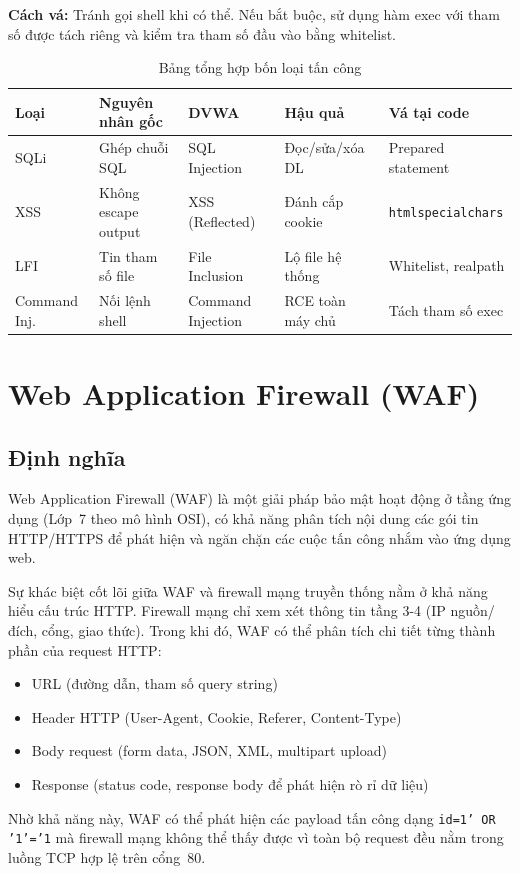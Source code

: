 \documentclass[12pt,a4paper,twoside]{report}
\begin{document}
\textbf{Cách vá:} Tránh gọi shell khi có thể. Nếu bắt buộc, sử dụng hàm exec với tham số được tách riêng và kiểm tra tham số đầu vào bằng whitelist.

\begin{table}[H]
\centering
\caption{Bảng tổng hợp bốn loại tấn công}
\label{tab:four_attacks}
\begin{tabular}{L{2.2cm}L{2.8cm}L{2.5cm}L{2.5cm}L{2.5cm}}
\toprule
\textbf{Loại} & \textbf{Nguyên nhân gốc} & \textbf{DVWA} & \textbf{Hậu quả} & \textbf{Vá tại code} \\
\midrule
SQLi & Ghép chuỗi SQL & SQL Injection & Đọc/sửa/xóa DL & Prepared statement \\
XSS & Không escape output & XSS (Reflected) & Đánh cắp cookie & \texttt{htmlspecialchars} \\
LFI & Tin tham số file & File Inclusion & Lộ file hệ thống & Whitelist, realpath \\
Command Inj.& Nối lệnh shell & Command Injection & RCE toàn máy chủ & Tách tham số exec \\
\bottomrule
\end{tabular}
\end{table}

\section{Web Application Firewall (WAF)}

\subsection{Định nghĩa}

Web Application Firewall (WAF) là một giải pháp bảo mật hoạt động ở tầng ứng dụng (Lớp~7 theo mô hình OSI), có khả năng phân tích nội dung các gói tin HTTP/HTTPS để phát hiện và ngăn chặn các cuộc tấn công nhắm vào ứng dụng web.

Sự khác biệt cốt lõi giữa WAF và firewall mạng truyền thống nằm ở khả năng hiểu cấu trúc HTTP. Firewall mạng chỉ xem xét thông tin tầng 3-4 (IP nguồn/đích, cổng, giao thức). Trong khi đó, WAF có thể phân tích chi tiết từng thành phần của request HTTP:
\begin{itemize}
    \item URL (đường dẫn, tham số query string)
    \item Header HTTP (User-Agent, Cookie, Referer, Content-Type)
    \item Body request (form data, JSON, XML, multipart upload)
    \item Response (status code, response body để phát hiện rò rỉ dữ liệu)
\end{itemize}
Nhờ khả năng này, WAF có thể phát hiện các payload tấn công dạng \texttt{id=1' OR '1'='1} mà firewall mạng không thể thấy được vì toàn bộ request đều nằm trong luồng TCP hợp lệ trên cổng~80.
\end{document}
